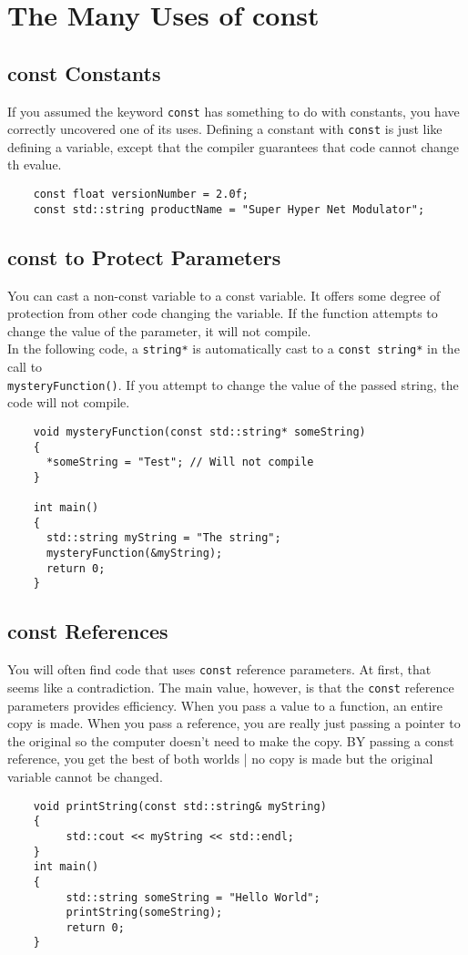 \documentclass{article}
\begin{document}
\section{The Many Uses of const}
\subsection{const Constants}
If you assumed the keyword \texttt{const} has something to do with constants, you have correctly
uncovered one of its uses. Defining a constant with \texttt{const} is just like defining a variable,
except that the compiler guarantees that code cannot change th evalue.
\begin{verbatim}
    const float versionNumber = 2.0f;
    const std::string productName = "Super Hyper Net Modulator";
\end{verbatim}
\subsection{const to Protect Parameters}
You can cast a non-const variable to a const variable. It offers some degree of protection from other
code changing the variable. If the function attempts to change the value of the parameter, it will
not compile. \\
In the following code, a \texttt{string*} is automatically cast to a \texttt{const string*} in the call
to \\\texttt{mysteryFunction()}. If you attempt to change the value of the passed string, the code
will not compile.
\begin{verbatim}
    void mysteryFunction(const std::string* someString)
    {
      *someString = "Test"; // Will not compile
    }

    int main()
    {
      std::string myString = "The string";
      mysteryFunction(&myString);
      return 0;
    }
\end{verbatim}
\subsection{const References}
You will often find code that uses \texttt{const} reference parameters. At first, that seems like a
contradiction. The main value, however, is that the \texttt{const} reference parameters provides
efficiency. When you pass a value to a function, an entire copy is made. When you pass a reference,
you are really just passing a pointer to the original so the computer doesn't need to make the copy.
BY passing a const reference, you get the best of both worlds | no copy is made but the original variable
cannot be changed.
\begin{verbatim}
    void printString(const std::string& myString)
    {
         std::cout << myString << std::endl;
    }
    int main()
    {
         std::string someString = "Hello World";
         printString(someString);
         return 0;
    }
\end{verbatim}
\end{document}
